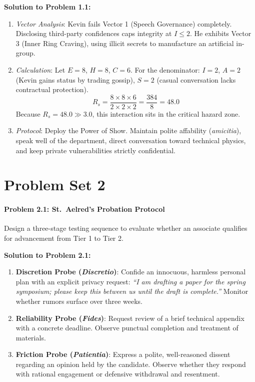 \documentclass[11pt]{report}
\begin{document}
\begin{blackboard}
\textbf{Solution to Problem 1.1:}
\begin{enumerate}
    \item \textit{Vector Analysis}: Kevin fails Vector 1 (Speech Governance) completely. Disclosing third-party confidences caps integrity at $I \le 2$. He exhibits Vector 3 (Inner Ring Craving), using illicit secrets to manufacture an artificial in-group.
    \item \textit{Calculation}: Let $E = 8$, $H = 8$, $C = 6$. For the denominator: $I = 2$, $A = 2$ (Kevin gains status by trading gossip), $S = 2$ (casual conversation lacks contractual protection).
    \[
    R_s = \frac{8 \times 8 \times 6}{2 \times 2 \times 2} = \frac{384}{8} = 48.0
    \]
    Because $R_s = 48.0 \gg 3.0$, this interaction sits in the critical hazard zone.
    \item \textit{Protocol}: Deploy the Power of Show. Maintain polite affability (\textit{amicitia}), speak well of the department, direct conversation toward technical physics, and keep private vulnerabilities strictly confidential.
\end{enumerate}
\end{blackboard}

\section{Problem Set 2}

\paragraph{Problem 2.1: St.~Aelred's Probation Protocol}
Design a three-stage testing sequence to evaluate whether an associate qualifies for advancement from Tier 1 to Tier 2.

\begin{blackboard}
\textbf{Solution to Problem 2.1:}
\begin{enumerate}
    \item \textbf{Discretion Probe (\textit{Discretio})}: Confide an innocuous, harmless personal plan with an explicit privacy request: \textit{``I am drafting a paper for the spring symposium; please keep this between us until the draft is complete.''} Monitor whether rumors surface over three weeks.
    \item \textbf{Reliability Probe (\textit{Fides})}: Request review of a brief technical appendix with a concrete deadline. Observe punctual completion and treatment of materials.
    \item \textbf{Friction Probe (\textit{Patientia})}: Express a polite, well-reasoned dissent regarding an opinion held by the candidate. Observe whether they respond with rational engagement or defensive withdrawal and resentment.
\end{enumerate}
\end{blackboard}
\end{document}
